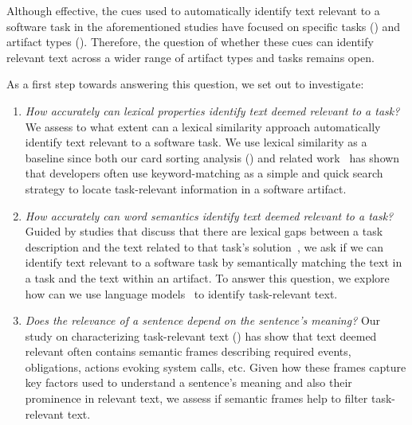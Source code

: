 Although effective, the cues used to automatically identify text relevant to a software task in the aforementioned studies have focused on specific tasks () and artifact types ().
Therefore, the question of whether these cues can identify relevant text across a wider range of artifact types and tasks remains open. 



As a first step towards answering this question, we set out to investigate:


\begin{enumerate}
    \item \textit{How accurately can lexical properties identify text deemed relevant to a task?}
    We assess to what extent can a lexical similarity approach automatically identify text relevant to a software task.
    We use lexical similarity as a baseline since both our card sorting analysis () and related work~\cite{Ko2006a, Freund2015} has shown
    that developers often use keyword-matching as a simple and quick search strategy to locate task-relevant information in a software artifact.


    \item \textit{How accurately can word semantics identify text deemed relevant to a task?}
    Guided by studies that discuss that there are lexical gaps between a task description and the text related to that task's solution~\cite{silva2019, Huang2018, Ye2016},
    we ask if we can identify text relevant to a software task by semantically matching the text in a task and the text within an artifact.
    To answer this question, we explore how can we use language models~\cite{Devlin2018Bert, Mikolov2013} to identify  task-relevant text.

    
    \item \textit{Does the relevance of a sentence depend on the sentence's meaning?}
    Our study on characterizing task-relevant text () has show that text deemed relevant often contains semantic frames describing 
     required events, obligations, actions evoking system calls, etc.
    Given how these frames capture key factors used to understand a sentence's meaning
    and also their prominence in relevant text, 
    we assess if semantic frames help to filter task-relevant text.
\end{enumerate}




